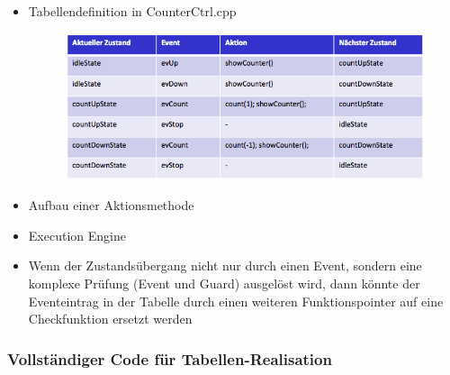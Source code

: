 \begin{itemize}
\item Tabellendefinition in CounterCtrl.cpp
\begin{figure}[h]
  \centering
  \includegraphics[scale = 0.5]{images/FSM/tabelle}  
\end{figure}


\item Aufbau einer Aktionsmethode


\item Execution Engine


\item Wenn der Zustandsübergang nicht nur durch einen Event, sondern eine
komplexe Prüfung (Event und Guard) ausgelöst wird, dann könnte der Eventeintrag
in der Tabelle durch einen weiteren Funktionspointer auf eine Checkfunktion
ersetzt werden



\end{itemize}

\subsubsection{Vollständiger Code für Tabellen-Realisation}



